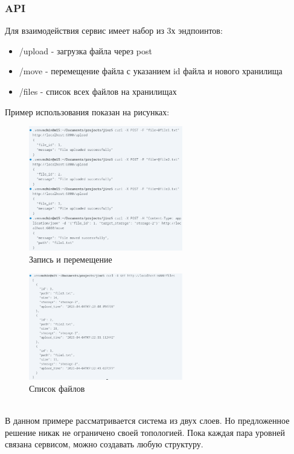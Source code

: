 \documentclass{article}
\begin{document}
\subsubsection{API}
Для взаимодействия сервис имеет набор из 3х эндпоинтов:
\begin{itemize}
   \item /upload - загрузка файла через post
   \item /move - перемещение файла с указанием id файла и нового хранилища
   \item /files - список всех файлов на хранилищах
\end{itemize}
Пример использования показан на рисунках:
\begin{figure}[!h]
   \centering
   \includegraphics[width=0.6\textwidth]{images/serv1.png}
   \caption{Запись и перемещение}
\end{figure}
\begin{figure}[!h]
   \centering
   \includegraphics[width=0.6\textwidth]{images/serv2.png}
   \caption{Список файлов}
\end{figure}\\
В данном примере рассматривается система из двух слоев. Но предложенное решение никак не ограничено своей топологией. Пока каждая пара уровней связана сервисом, можно создавать любую структуру.
\newpage
\end{document}
